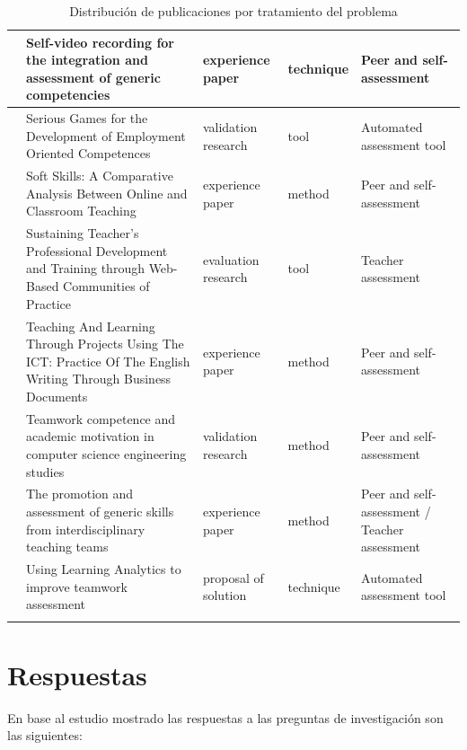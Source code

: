 \begin{landscape}
\begin{center}
\begin{longtable}{| c | m{9cm} | m{4cm} | m{2.5cm} | m{3.5cm} |}
    \hline
    \cite{masip2013self} & Self-video recording for the integration and assessment of generic competencies & experience paper & technique & Peer and self-assessment \\
    \hline
    \cite{guenaga2013serious} & Serious Games for the Development of Employment Oriented Competences & validation research & tool & Automated assessment tool \\
    \hline
    \cite{ruizacarate2013soft} & Soft Skills: A Comparative Analysis Between Online and Classroom Teaching & experience paper & method & Peer and self-assessment \\
    \hline
    \cite{starcic2008sustaining} & Sustaining Teacher's Professional Development and Training through Web-Based Communities of Practice & evaluation research & tool & Teacher assessment \\
    \hline
    \cite{renau2010teaching} & Teaching And Learning Through Projects Using The ICT: Practice Of The English Writing Through Business Documents & experience paper & method & Peer and self-assessment \\
    \hline
    \cite{martinez2014teamwork} & Teamwork competence and academic motivation in computer science engineering studies & validation research & method & Peer and self-assessment \\
    \hline
    \cite{carreras2013promotion} & The promotion and assessment of generic skills from interdisciplinary teaching teams & experience paper & method & Peer and self-assessment / Teacher assessment \\
    \hline
    \cite{fidalgo:2015} & Using Learning Analytics to improve teamwork assessment & proposal of solution & technique & Automated assessment tool \\
    \hline
\caption{Distribución de publicaciones por tratamiento del problema}
\label{tab:ListadoTrabajos}
\end{longtable}
\end{center}
\end{landscape}

\pagestyle{fancy}
\section{Respuestas}

En base al estudio mostrado las respuestas a las preguntas de investigación son las siguientes:


